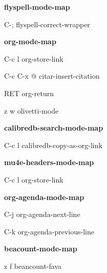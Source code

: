 \documentclass[10pt]{article}
\renewcommand\subsection[1]{\smallskip\par\textbf{\color{heading}#1}}
\begin{document}
\begin{multicols}{4}
  \subsection{flyspell-mode-map}
  \begin{keylist}
    \item[C-;] flyspell-correct-wrapper
  \end{keylist}

  \subsection{org-mode-map}
  \begin{keylist}
    \item[C-c l] org-store-link
    \item[C-c C-x @] citar-insert-citation
    \item[RET] org-return
    \item[z w] olivetti-mode
  \end{keylist}

  \subsection{calibredb-search-mode-map}
  \begin{keylist}
    \item[C-c l] calibredb-copy-as-org-link
  \end{keylist}

  \subsection{mu4e-headers-mode-map}
  \begin{keylist}
    \item[C-c l] org-store-link
  \end{keylist}

  \subsection{org-agenda-mode-map}
  \begin{keylist}
    \item[C-j] org-agenda-next-line
    \item[C-k] org-agenda-previous-line
  \end{keylist}

  \subsection{beacount-mode-map}
  \begin{keylist}
    \item[z f] beancount-fava
  \end{keylist}



\end{multicols}
\end{document}
